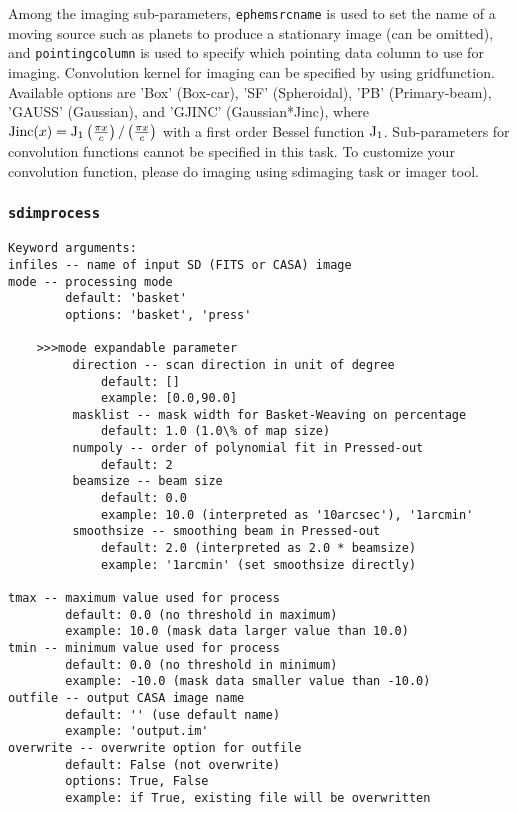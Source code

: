 Among the imaging sub-parameters, {\tt ephemsrcname} is used to set
the name of a moving source such as planets to produce a stationary
image (can be omitted), and {\tt pointingcolumn} is used to specify
which pointing data column to use for imaging.  Convolution kernel for
imaging can be specified by using gridfunction. Available options are
'Box' (Box-car), 'SF' (Spheroidal), 'PB' (Primary-beam), 'GAUSS'
(Gaussian), and 'GJINC' (Gaussian*Jinc), where ${\rm Jinc}(x) = {\rm
  J}_1 \left( \frac{\pi x}{c} \right) / \left(\frac{\pi x}{c} \right)
$ with a first order Bessel function ${\rm J}_1$. Sub-parameters for
convolution functions cannot be specified in this task. To customize
your convolution function, please do imaging using sdimaging task or
imager tool.

\subsubsection{{\tt sdimprocess}}
\label{section:sd.sdtasks.tasks.sdimprocess}

\begin{verbatim}
Keyword arguments:
infiles -- name of input SD (FITS or CASA) image
mode -- processing mode
        default: 'basket'
        options: 'basket', 'press'

    >>>mode expandable parameter
         direction -- scan direction in unit of degree
             default: []
             example: [0.0,90.0]
         masklist -- mask width for Basket-Weaving on percentage
             default: 1.0 (1.0\% of map size)
         numpoly -- order of polynomial fit in Pressed-out
             default: 2
         beamsize -- beam size 
             default: 0.0
             example: 10.0 (interpreted as '10arcsec'), '1arcmin'
         smoothsize -- smoothing beam in Pressed-out
             default: 2.0 (interpreted as 2.0 * beamsize)
             example: '1arcmin' (set smoothsize directly)

tmax -- maximum value used for process
        default: 0.0 (no threshold in maximum)
        example: 10.0 (mask data larger value than 10.0)
tmin -- minimum value used for process
        default: 0.0 (no threshold in minimum)
        example: -10.0 (mask data smaller value than -10.0)
outfile -- output CASA image name
        default: '' (use default name)
        example: 'output.im'
overwrite -- overwrite option for outfile
        default: False (not overwrite)
        options: True, False
        example: if True, existing file will be overwritten
\end{verbatim}

